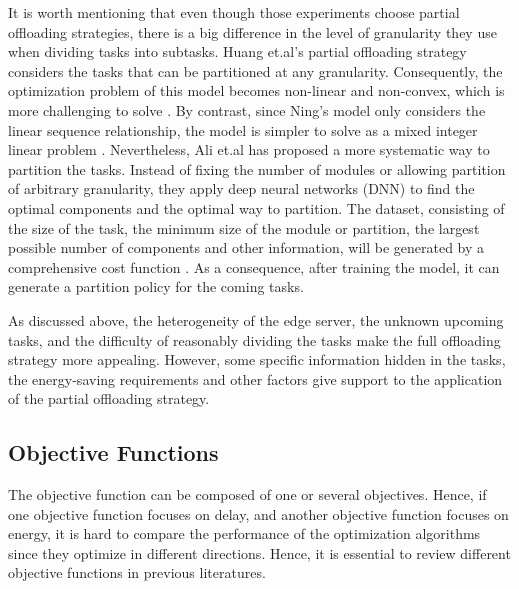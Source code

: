 \documentclass[a4paper,11pt]{article}
\begin{document}
It is worth mentioning that even though those experiments choose partial offloading strategies, there is a big difference in the level of granularity they use when dividing tasks into subtasks. Huang et.al's partial offloading strategy considers the tasks that can be partitioned at any granularity. Consequently, the optimization problem of this model becomes non-linear and non-convex, which is more challenging to solve \cite{Distributed_Offloading_in_Overlapping_Areas}. By contrast, since Ning's model only considers the linear sequence relationship, the model is simpler to solve as a mixed integer linear problem \cite{A_Cooperative_Partial_Computation_Offloading_Scheme_for_Mobile_Edge}. Nevertheless, Ali et.al has proposed a more systematic way to partition the tasks. Instead of fixing the number of modules or allowing partition of arbitrary granularity, they apply deep neural networks (DNN) to find the optimal components and the optimal way to partition. The dataset, consisting of the size of the task, the minimum size of the module or partition, the largest possible number of components and other information, will be generated by a comprehensive cost function \cite{granuity_2}. As a consequence, after training the model, it can generate a partition policy for the coming tasks.\newline

As discussed above, the heterogeneity of the edge server, the unknown upcoming tasks, and the difficulty of reasonably dividing the tasks make the full offloading strategy more appealing. However, some specific information hidden in the tasks, the energy-saving requirements and other factors give support to the application of the partial offloading strategy. 

\subsection{Objective Functions}
The objective function can be composed of one or several objectives. Hence, if one objective function focuses on delay, and another objective function focuses on energy, it is hard to compare the performance of the optimization algorithms since they optimize in different directions. Hence, it is essential to review different objective functions in previous literatures.\newline
\end{document}
